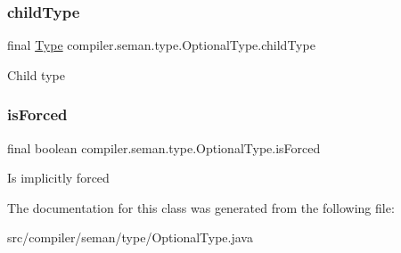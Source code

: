 \subsubsection{\texorpdfstring{child\+Type}{childType}}
{\footnotesize\ttfamily final \hyperlink{classcompiler_1_1seman_1_1type_1_1_type}{Type} compiler.\+seman.\+type.\+Optional\+Type.\+child\+Type}

Child type \mbox{\label{classcompiler_1_1seman_1_1type_1_1_optional_type_ab55a110a6f067b755cb1dca374ab1e46}} 
\subsubsection{\texorpdfstring{is\+Forced}{isForced}}
{\footnotesize\ttfamily final boolean compiler.\+seman.\+type.\+Optional\+Type.\+is\+Forced}

Is implicitly forced 

The documentation for this class was generated from the following file\+:\begin{DoxyCompactItemize}
\item 
src/compiler/seman/type/Optional\+Type.\+java\end{DoxyCompactItemize}
